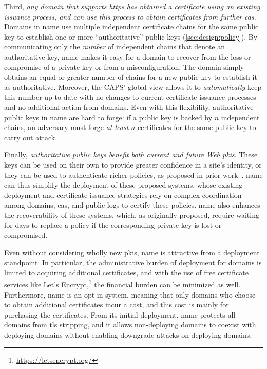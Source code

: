 Third, \emph{any domain that supports \ac{https} has obtained a certificate
using an existing issuance process, and can use this process to obtain
certificates from further \acp{ca}}. Domains in \ac{name} use multiple
independent certificate chains for the same public key to establish one or more
``authoritative'' public keys (\autoref{sec:design:policy}). By communicating
only the \emph{number} of independent chains that denote an authoritative key,
\ac{name} makes it easy for a domain to recover from the loss or compromise of a
private key or from a misconfiguration. The domain simply obtains an equal or
greater number of chains for a new public key to establish it as authoritative.
Moreover, the CAPS' global view allows it to
\emph{automatically} keep this number up to date with no changes to current
certificate issuance processes and no additional action from domains. Even with
this flexibility, authoritative public keys in \ac{name} are hard to forge: if a
public key is backed by $n$ independent chains, an adversary must forge \emph{at
least} $n$ certificates for the same public key to carry out  attack.

Finally, \emph{authoritative public keys benefit both current and future Web
\acp{pki}}. These keys can be used on their own to provide greater confidence in
a site's identity, or they can be used to authenticate richer policies, as
proposed in prior work~\cite{basin2014arpki, szalachowski2014policert}.
\ac{name} can thus simplify the deployment of these proposed systems, whose
existing deployment and certificate issuance strategies rely on complex
coordination among domains, \acp{ca}, and public logs to certify these policies.
\ac{name} also enhances the recoverability of these systems, which, as
originally proposed, require waiting for days to replace a policy if the
corresponding private key is lost or compromised.

Even without considering wholly new \acp{pki}, \ac{name} is attractive from a
deployment standpoint. In particular, the administrative burden of deployment
for domains is limited to acquiring additional certificates, and with the use of
free certificate services like Let's
Encrypt,\footnote{\url{https://letsencrypt.org/}} the financial burden can be
minimized as well. Furthermore, \ac{name} is an opt-in system, meaning that only
domains who choose to obtain additional certificates incur a cost, and this cost
is mainly for purchasing the certificates. From its initial deployment,
\ac{name} protects all domains from \ac{tls} stripping, and it allows
non-deploying domains to coexist with deploying domains without enabling
downgrade attacks on deploying domains.

